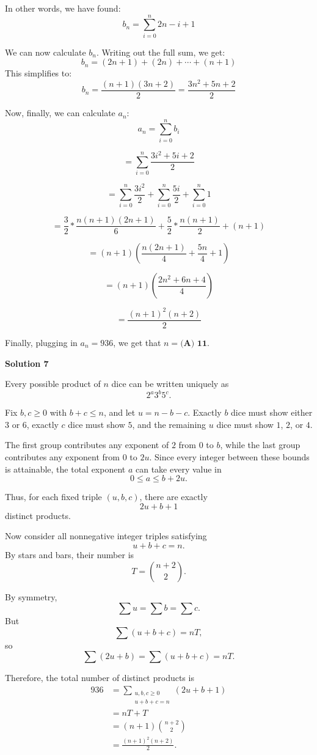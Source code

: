 \begin{enumerate}
 In other words, we have found:
 \[b_n=\sum_{i=0}^{n} 2n-i+1\]

 We can now calculate $b_n$. Writing out the full sum, we get:
 \[b_n=(2n+1)+(2n)+\cdots+(n+1)\]This simplifies to:
 \[b_n=\frac{(n+1)(3n+2)}{2}=\frac{3n^2+5n+2}{2}\]

 Now, finally, we can calculate $a_n$:
 \[a_n=\sum_{i=0}^{n} b_i\]

 \[=\sum_{i=0}^{n} \frac{3i^2+5i+2}{2}\]

 \[=\sum_{i=0}^{n} \frac{3i^2}{2} + \sum_{i=0}^{n} \frac{5i}{2} + \sum_{i=0}^{n} 1\]

 \[=\frac{3}{2}*\frac{n(n+1)(2n+1)}{6} + \frac{5}{2}*\frac{n(n+1)}{2} + (n+1)\]

 \[=(n+1)(\frac{n(2n+1)}{4}+\frac{5n}{4}+1)\]

 \[=(n+1)(\frac{2n^2+6n+4}{4})\]

 \[=\frac{(n+1)^2(n+2)}{2}\]

 Finally, plugging in $a_n=936$, we get that $n=\boxed{\textbf{(A) 11}}$.

 


 



\textbf{Solution 7}

Every possible product of $n$ dice can be written uniquely as
 \[2^a3^b5^c.\]

 Fix $b,c\ge 0$ with $b+c\le n$, and let $u=n-b-c$. Exactly $b$ dice must show either $3$ or $6$, exactly $c$ dice must show $5$, and the remaining $u$ dice must show $1$, $2$, or $4$.

 The first group contributes any exponent of $2$ from $0$ to $b$, while the last group contributes any exponent from $0$ to $2u$. Since every integer between these bounds is attainable, the total exponent $a$ can take every value in
 \[0\le a\le b+2u.\]

 Thus, for each fixed triple $(u,b,c)$, there are exactly
 \[2u+b+1\]distinct products.

 Now consider all nonnegative integer triples satisfying
 \[u+b+c=n.\]By stars and bars, their number is
 \[T=\binom{n+2}{2}.\]

 By symmetry,
 \[\sum u=\sum b=\sum c.\]But
 \[\sum(u+b+c)=nT,\]so
 \[\sum(2u+b)=\sum(u+b+c)=nT.\]

 Therefore, the total number of distinct products is\begin{align*}936&=\sum_{\substack{u,b,c\ge0\\u+b+c=n}}(2u+b+1)\\&=nT+T\\&=(n+1)\binom{n+2}{2}\\&=\frac{(n+1)^2(n+2)}{2}.\end{align*}



\end{enumerate}

